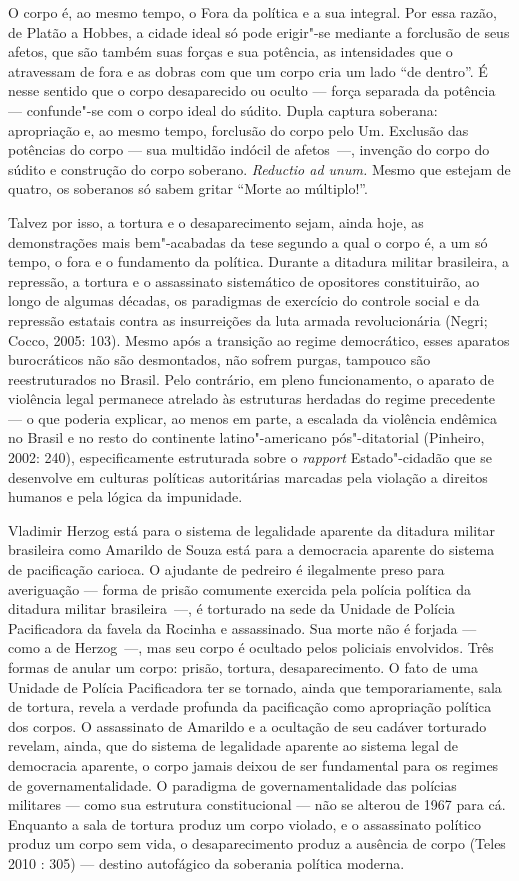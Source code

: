 O corpo é, ao mesmo tempo, o Fora da política e a sua integral. Por essa
razão, de Platão a Hobbes, a cidade ideal só pode erigir"-se mediante a
forclusão de seus afetos, que são também suas forças e sua potência, as
intensidades que o atravessam de fora e as dobras com que um corpo cria
um lado ``de dentro''. É nesse sentido que o corpo desaparecido ou
oculto --- força separada da potência --- confunde"-se com o corpo ideal do
súdito. Dupla captura soberana: apropriação e, ao mesmo tempo, forclusão
do corpo pelo Um. Exclusão das potências do corpo --- sua multidão
indócil de \mbox{afetos~---,} invenção do corpo do súdito e construção do corpo
soberano. \emph{Reductio ad unum. }Mesmo que estejam de quatro, os
soberanos só sabem gritar ``Morte ao múltiplo!''.

Talvez por isso, a tortura e o desaparecimento sejam, ainda hoje, as
demonstrações mais bem"-acabadas da tese segundo a qual o corpo é, a um
só tempo, o fora e o fundamento da política. Durante a ditadura militar
brasileira, a repressão, a tortura e o assassinato sistemático de
opositores constituirão, ao longo de algumas décadas, os paradigmas de
exercício do controle social e da repressão estatais contra as
insurreições da luta armada revolucionária (Negri; Cocco, 2005: 103).
Mesmo após a transição ao regime democrático, esses aparatos
burocráticos não são desmontados, não sofrem purgas, tampouco são
reestruturados no Brasil. Pelo contrário, em pleno funcionamento, o
aparato de violência legal permanece atrelado às estruturas herdadas do
regime precedente --- o que poderia explicar, ao menos em parte, a
escalada da violência endêmica no Brasil e no resto do continente
latino"-americano pós"-ditatorial (Pinheiro, 2002: 240), especificamente
estruturada sobre o \emph{rapport }Estado"-cidadão que se desenvolve em
culturas políticas autoritárias marcadas pela violação a direitos
humanos e pela lógica da impunidade.

Vladimir Herzog está para o sistema de legalidade aparente da ditadura
militar brasileira como Amarildo de Souza está para a democracia
aparente do sistema de pacificação carioca. O ajudante de pedreiro é
ilegalmente preso para averiguação --- forma de prisão comumente exercida
pela polícia política da ditadura militar brasileira~---, é torturado na
sede da Unidade de Polícia Pacificadora da favela da Rocinha e
assassinado. Sua morte não é forjada --- como a de Herzog~---, mas seu
corpo é ocultado pelos policiais envolvidos. Três formas de anular um
corpo: prisão, tortura, desaparecimento. O fato de uma Unidade de
Polícia Pacificadora ter se tornado, ainda que temporariamente, sala de
tortura, revela a verdade profunda da pacificação como apropriação
política dos corpos. O assassinato de Amarildo e a ocultação de seu
cadáver torturado revelam, ainda, que do sistema de legalidade aparente
ao sistema legal de democracia aparente, o corpo jamais deixou de ser
fundamental para os regimes de governamentalidade. O paradigma de
governamentalidade das polícias militares --- como sua estrutura
constitucional --- não se alterou de 1967 para cá. Enquanto a sala de
tortura produz um corpo violado, e o assassinato político produz um
corpo sem vida, o desaparecimento produz a ausência de corpo (Teles 2010
: 305) --- destino autofágico da soberania política moderna.

